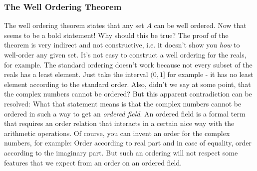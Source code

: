 % 











\subsubsection{The Well Ordering Theorem} 
The well ordering theorem states that any set $A$ can be well ordered. Now that seems to be a bold statement! Why should this be true? The proof of the theorem is very indirect and not constructive, i.e. it doesn't show you \emph{how} to well-order any given set. It's not easy to construct a well ordering for the reals, for example. The standard ordering doesn't work because not every subset of the reals has a least element. Just take the interval $(0,1]$ for example - it has no least element according to the standard order. Also, didn't we say at some point, that the complex numbers cannot be ordered? But this apparent contradiction can be resolved: What that statement means is that the complex numbers cannot be ordered in such a way to get an \emph{ordered field}. An ordered field is a formal term that requires an order relation that interacts in a certain nice way with the arithmetic operations. Of course, you can invent an order for the complex numbers, for example: Order according to real part and in case of equality, order according to the imaginary part. But such an ordering will not respect some features that we expect from an order on an ordered field.

